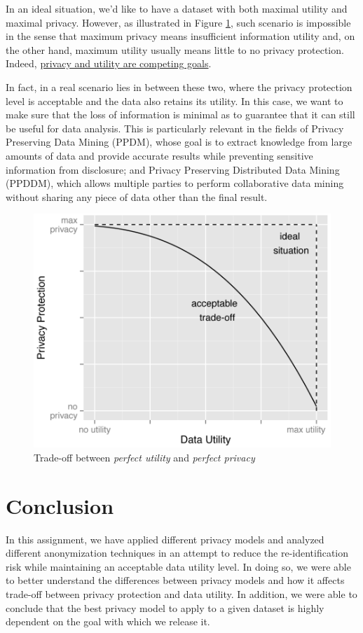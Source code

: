 \documentclass[a4paper, 11pt]{article}
\begin{document}
In an ideal situation, we'd like to have a dataset with both maximal utility 
and maximal privacy. However, as illustrated in Figure 
\ref{fig:utility_privacy}, such scenario is impossible in the sense that 
maximum privacy means insufficient information utility and, on the other hand, 
maximum utility usually means little to no privacy protection. Indeed, 
\uline{privacy and utility are competing goals}.

In fact, in a real scenario lies in between these two, where the privacy 
protection level is acceptable and the data also retains its utility. In this 
case, we want to make sure that the loss of information is minimal as to 
guarantee that it can still be useful for data analysis. This is particularly 
relevant in the fields of Privacy Preserving Data Mining (PPDM), whose goal is 
to extract knowledge from large amounts of data and provide accurate results 
while preventing sensitive information from disclosure; and Privacy Preserving 
Distributed Data Mining (PPDDM), which allows multiple parties to perform 
collaborative data mining without sharing any piece of data other than the 
final result.\\

\begin{figure}[H]
    \centering
     \includegraphics[width=.6\textwidth]{img/privacy-utility.png}
    \caption{Trade-off between \textit{perfect utility} and \textit{perfect 
privacy} \cite{emam2013anonymizing}}
    \label{fig:utility_privacy}
\end{figure}

\pagebreak

\section{Conclusion} \label{sec:conclusion}

In this assignment, we have applied different privacy models and analyzed 
different anonymization techniques in an attempt to reduce the 
re-identification risk while maintaining an acceptable data utility level. In 
doing so, we were able to better understand the differences between privacy 
models and how it affects trade-off between privacy protection and data 
utility. In addition, we were able to conclude that the best privacy model to 
apply to a given dataset is highly dependent on the goal with which we release 
it.
\end{document}
